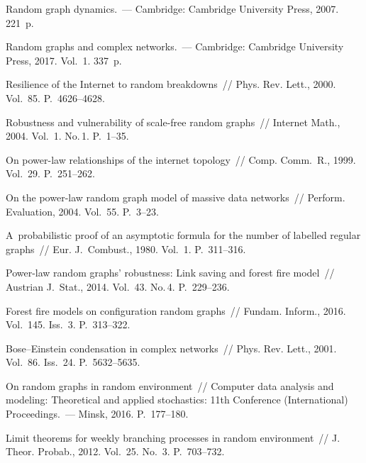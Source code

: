 \begin{multicols}{2}
\vspace*{-12pt}

{\small\frenchspacing
 {%
 
 \vspace*{-2pt}
 
 \begin{thebibliography}{99}
 Random graph dynamics.~--- Cambridge: Cambridge University
Press, 2007. 221~p.

 Random graphs and complex networks.~--- Cambridge:
Cambridge University Press, 2017. Vol.~1. 337~p.

 Resilience of the Internet
to random breakdowns~// Phys. Rev. Lett., 2000. Vol.~85. P.~4626--4628.

 Robustness and vulnerability of scale-free
random graphs~// Internet Math., 2004. Vol.~1. No.\,1. P.~1--35.

 On power-law relationships of
the internet topology~// Comp. Comm.~R., 1999. Vol.~29. P.~251--262.

 On the power-law random graph model of massive
data networks~// Perform. Evaluation, 2004. Vol.~55. P.~3--23.

 A~probabilistic proof of an asymptotic formula
for the number of labelled regular graphs~// Eur. J.~Combust., 1980. Vol.~1. P.~311--316.

 Power-law random graphs' robustness: Link saving
and forest fire model~// Austrian J.~Stat., 2014. Vol.~43. No.\,4. P.~229--236.

 Forest fire models on configuration random
graphs~// Fundam. Inform., 2016. Vol.~145. Iss.~3. P.~313--322.

 Bose--Einstein condensation in complex
networks~// Phys. Rev. Lett., 2001. Vol.~86. Iss.~24. P.~5632--5635.

 On random graphs in random environment~// Computer data
analysis and modeling: Theoretical and applied stochastics: 
11th Conference (International)
Proceedings.~--- Minsk, 2016. P.~177--180.

 Limit theorems
for weekly branching processes in random environment~// J.~ Theor. Probab.,
2012. Vol.~25. No.~3. P.~703--732.


\end{thebibliography}}}
\end{multicols}
